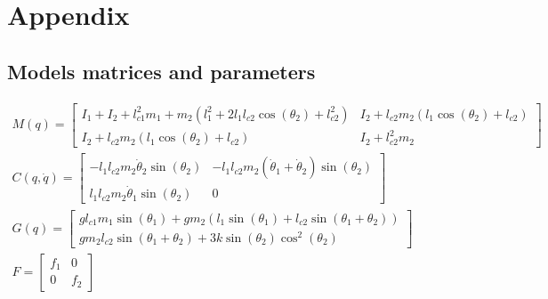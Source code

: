 \section{Appendix}


\subsection{Models matrices and parameters}
\label{app:Models_matrices_and_parameters}

\begin{gather*}
    M(q) = \begin{bmatrix}
        I_1 + I_2 + l_{c1}^2 m_1 + m_2(l_1^2 + 2l_1 l_{c2} \cos(\theta_2) + l_{c2}^2) & I_2 + l_{c2} m_2 (l_1 \cos(\theta_2) + l_{c2}) \\ 
        I_2 + l_{c2} m_2 (l_1 \cos(\theta_2) + l_{c2}) & I_2 + l_{c2}^2 m_2
    \end{bmatrix} \\[15pt]
    C(q, \dot{q}) = \begin{bmatrix}
        -l_1 l_{c2} m_2 \dot{\theta}_2 \sin(\theta_2) & -l_1 l_{c2} m_2 (\dot{\theta}_1 + \dot{\theta}_2) \sin(\theta_2) \\ 
        l_1 l_{c2} m_2 \dot{\theta}_1 \sin(\theta_2) & 0
    \end{bmatrix} \\[15pt]
    G(q) = \begin{bmatrix}
        g l_{c1} m_1 \sin(\theta_1) + g m_2 (l_1 \sin(\theta_1) + l_{c2} \sin(\theta_1 + \theta_2)) \\ 
        g m_2 l_{c2} \sin(\theta_1 + \theta_2) + 3k \sin(\theta_2) \cos^2(\theta_2)
    \end{bmatrix} \\[15pt]
    F = \begin{bmatrix}
        f_{1} & 0 \\
        0 & f_{2}
    \end{bmatrix}
\end{gather*}

